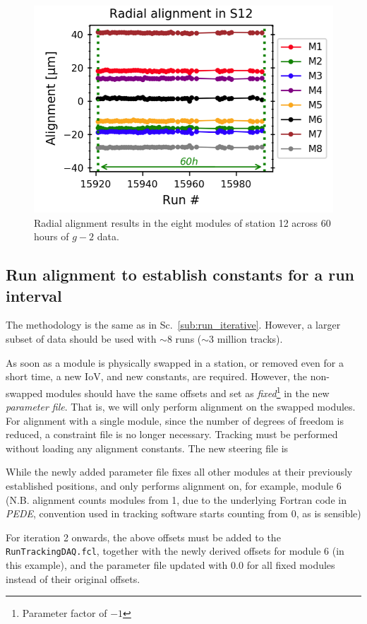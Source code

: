 \documentclass[12pt]{article}
\begin{document}
    \vspace{-0.5cm}
    \begin{figure}[!ht]
    \centering
    \includegraphics[width = 0.5\linewidth]{fig/60h.png}
    \vspace{-0.2cm}
    \caption{Radial alignment results in the eight modules of station 12 across 60 hours of $g-2$ data.}
    \label{fig:60h}
    \end{figure}
\clearpage
\subsection{Run alignment to establish constants for a run interval}
The methodology is the same as in Sc.~\ref{sub:run_iterative}. However, a larger subset of data should be used with $\sim8$ runs ($\sim$3 million tracks). 

As soon as a module is physically swapped in a station, or removed even for a short time, a new IoV, and new constants, are required. However, the non-swapped modules should have the same offsets and set as \textit{fixed}\footnote{Parameter factor of $-1$} in the new \textit{parameter file}. That is, we will only perform alignment on the swapped modules. For alignment with a single module, since the number of degrees of freedom is reduced, a constraint file is no longer necessary. Tracking must be performed without loading any alignment constants. The new steering file is

While the newly added parameter file fixes all other modules at their previously established positions, and only performs alignment on, for example, module 6 (N.B. alignment counts modules from 1, due to the underlying Fortran code in \textit{PEDE}, convention used in tracking software starts counting from 0, as is sensible)

For iteration 2 onwards, the above offsets must be added to the \verb!RunTrackingDAQ.fcl!, together with the newly derived offsets for module 6 (in this example), and the parameter file updated with $0.0$ for all fixed modules instead of their original offsets.
\end{document}
